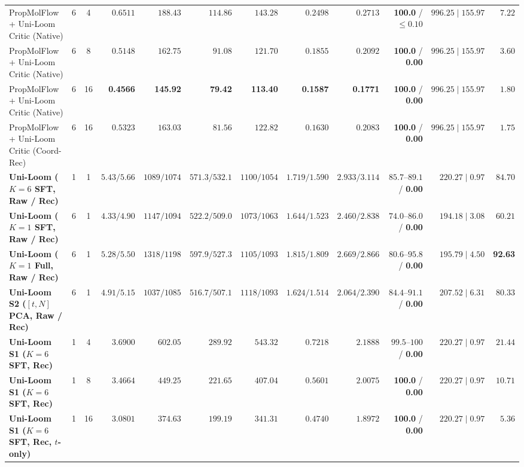 \documentclass[11pt,a4paper]{article}
\begin{document}
\begin{table}[t]
{\begin{tabular}{@{}lccrrrrrrrrr@{}}
PropMolFlow + Uni-Loom Critic (Native) & 6 & 4 & $0.6511$ & $188.43$ & $114.86$ & $143.28$ & $0.2498$ & $0.2713$ & \textbf{100.0} / $\le0.10$ & $996.25 \mid 155.97$ & $7.22$ \\
PropMolFlow + Uni-Loom Critic (Native) & 6 & 8 & $0.5148$ & $162.75$ & $91.08$ & $121.70$ & $0.1855$ & $0.2092$ & \textbf{100.0} / \textbf{0.00} & $996.25 \mid 155.97$ & $3.60$ \\
PropMolFlow + Uni-Loom Critic (Native) & 6 & 16 & \textbf{0.4566} & \textbf{145.92} & \textbf{79.42} & \textbf{113.40} & \textbf{0.1587} & \textbf{0.1771} & \textbf{100.0} / \textbf{0.00} & $996.25 \mid 155.97$ & $1.80$ \\
PropMolFlow + Uni-Loom Critic (Coord-Rec) & 6 & 16 & $0.5323$ & $163.03$ & $81.56$ & $122.82$ & $0.1630$ & $0.2083$ & \textbf{100.0} / \textbf{0.00} & $996.25 \mid 155.97$ & $1.75$ \\
\midrule
\textbf{Uni-Loom ($K=6$ SFT, Raw / Rec)} & 1 & 1 & $5.43 / 5.66$ & $1089 / 1074$ & $571.3 / 532.1$ & $1100 / 1054$ & $1.719 / 1.590$ & $2.933 / 3.114$ & $85.7\text{--}89.1$ / \textbf{0.00} & $220.27 \mid \mathbf{0.97}$ & $84.70$ \\
\textbf{Uni-Loom ($K=1$ SFT, Raw / Rec)} & 6 & 1 & $4.33 / 4.90$ & $1147 / 1094$ & $522.2 / 509.0$ & $1073 / 1063$ & $1.644 / 1.523$ & $2.460 / 2.838$ & $74.0\text{--}86.0$ / \textbf{0.00} & $194.18 \mid 3.08$ & $60.21$ \\
\textbf{Uni-Loom ($K=1$ Full, Raw / Rec)} & 6 & 1 & $5.28 / 5.50$ & $1318 / 1198$ & $597.9 / 527.3$ & $1105 / 1093$ & $1.815 / 1.809$ & $2.669 / 2.866$ & $80.6\text{--}95.8$ / \textbf{0.00} & $195.79 \mid 4.50$ & \textbf{92.63} \\
\textbf{Uni-Loom S2 ($[t,N]$ PCA, Raw / Rec)} & 6 & 1 & $4.91 / 5.15$ & $1037 / 1085$ & $516.7 / 507.1$ & $1118 / 1093$ & $1.624 / 1.514$ & $2.064 / 2.390$ & $84.4\text{--}91.1$ / \textbf{0.00} & $207.52 \mid 6.31$ & $80.33$ \\
\midrule
\textbf{Uni-Loom S1 ($K=6$ SFT, Rec)} & 1 & 4 & $3.6900$ & $602.05$ & $289.92$ & $543.32$ & $0.7218$ & $2.1888$ & $99.5\text{--}100$ / \textbf{0.00} & $220.27 \mid \mathbf{0.97}$ & $21.44$ \\
\textbf{Uni-Loom S1 ($K=6$ SFT, Rec)} & 1 & 8 & $3.4664$ & $449.25$ & $221.65$ & $407.04$ & $0.5601$ & $2.0075$ & \textbf{100.0} / \textbf{0.00} & $220.27 \mid \mathbf{0.97}$ & $10.71$ \\
\textbf{Uni-Loom S1 ($K=6$ SFT, Rec, $t$-only)} & 1 & 16 & $3.0801$ & $374.63$ & $199.19$ & $341.31$ & $0.4740$ & $1.8972$ & \textbf{100.0} / \textbf{0.00} & $220.27 \mid \mathbf{0.97}$ & $5.36$ \\

\end{tabular}}
\end{table}
\end{document}
